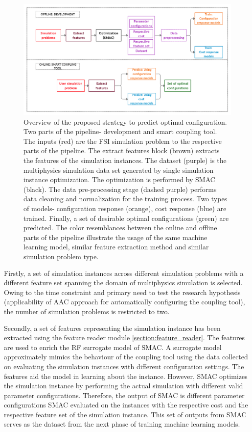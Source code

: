 \begin{figure}[!ht]
\centering
\includegraphics[width=1\linewidth,height=0.43\textheight]{images/Processflow.jpg}
\captionsetup{justification=justified}
\caption[Overview of the proposed strategy to predict optimal parameter configuration]{Overview of the proposed strategy to predict optimal configuration. Two parts of the pipeline- development and smart coupling tool. The inputs (red) are the FSI simulation problem to the respective parts of the pipeline. The extract features block (brown) extracts the features of the simulation instances. The dataset (purple) is the multiphysics simulation data set generated by single simulation instance optimization. The optimization is performed by SMAC (black). The data pre-processing stage (dashed purple) performs data cleaning and normalization for the training process. Two types of models- configuration response (orange), cost response (blue) are trained. Finally, a set of desirable optimal configurations (green) are predicted. The color resemblances between the online and offline parts of the pipeline illustrate the usage of the same machine learning model, similar feature extraction method and similar simulation problem type.}
\label{fig:processflow}
\end{figure}

Firstly, a set of simulation instances across different simulation problems with a different feature set spanning the domain of multiphysics simulation is selected. Owing to the time constraint and primary need to test the research hypothesis (applicability of AAC approach for automatically configuring the coupling tool), the number of simulation problems is restricted to two. 
    
Secondly, a set of features representing the simulation instance has been extracted using the feature reader module \ref{section:feature_reader}. The features are used to enrich the RF surrogate model of SMAC. A surrogate model approximately mimics the behaviour of the coupling tool using the data collected on evaluating the simulation instances with different configuration settings. The features aid the model in learning about the instance. However, SMAC optimizes the simulation instance by performing the actual simulation with different valid parameter configurations. Therefore, the output of SMAC is different parameter configurations SMAC evaluated on the instances with the respective cost and the respective feature set of the simulation instance. This set of outputs from SMAC serves as the dataset from the next phase of training machine learning models.
    
